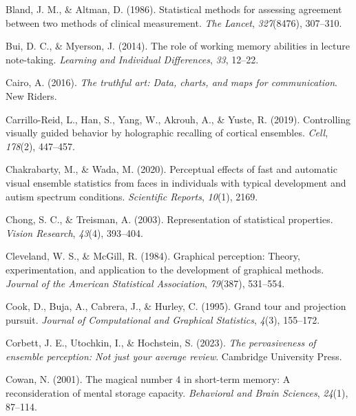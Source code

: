 \documentclass[print]{nuthesis}
\newlength{\cslhangindent}
\newenvironment{CSLReferences}[2]%
{\setlength{\parindent}{0pt}%
\everypar{\setlength{\hangindent}{\cslhangindent}}\ignorespaces}%
{\par}
\begin{document}
\begin{CSLReferences}{1}{0}
\leavevmode{}%
Bland, J. M., \& Altman, D. (1986). Statistical methods for assessing agreement between two methods of clinical measurement. \emph{The Lancet}, \emph{327}(8476), 307--310.

\leavevmode{}%
Bui, D. C., \& Myerson, J. (2014). The role of working memory abilities in lecture note-taking. \emph{Learning and Individual Differences}, \emph{33}, 12--22.

\leavevmode{}%
Cairo, A. (2016). \emph{The truthful art: Data, charts, and maps for communication}. New Riders.

\leavevmode{}%
Carrillo-Reid, L., Han, S., Yang, W., Akrouh, A., \& Yuste, R. (2019). Controlling visually guided behavior by holographic recalling of cortical ensembles. \emph{Cell}, \emph{178}(2), 447--457.

\leavevmode{}%
Chakrabarty, M., \& Wada, M. (2020). Perceptual effects of fast and automatic visual ensemble statistics from faces in individuals with typical development and autism spectrum conditions. \emph{Scientific Reports}, \emph{10}(1), 2169.

\leavevmode{}%
Chong, S. C., \& Treisman, A. (2003). Representation of statistical properties. \emph{Vision Research}, \emph{43}(4), 393--404.

\leavevmode{}%
Cleveland, W. S., \& McGill, R. (1984). Graphical perception: Theory, experimentation, and application to the development of graphical methods. \emph{Journal of the American Statistical Association}, \emph{79}(387), 531--554.

\leavevmode{}%
Cook, D., Buja, A., Cabrera, J., \& Hurley, C. (1995). Grand tour and projection pursuit. \emph{Journal of Computational and Graphical Statistics}, \emph{4}(3), 155--172.

\leavevmode{}%
Corbett, J. E., Utochkin, I., \& Hochstein, S. (2023). \emph{The pervasiveness of ensemble perception: Not just your average review}. Cambridge University Press.

\leavevmode{}%
Cowan, N. (2001). The magical number 4 in short-term memory: A reconsideration of mental storage capacity. \emph{Behavioral and Brain Sciences}, \emph{24}(1), 87--114.


\end{CSLReferences}
\end{document}
